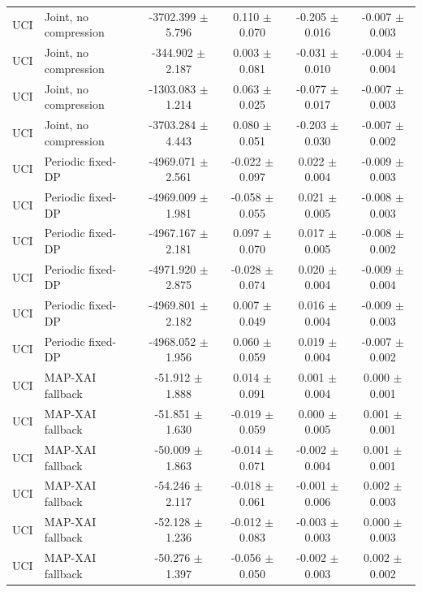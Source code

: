 \begin{table}[t]
\begin{tabular}{llcccc}
UCI & Joint, no compression & -3702.399 $\pm$ 5.796 & 0.110 $\pm$ 0.070 & -0.205 $\pm$ 0.016 & -0.007 $\pm$ 0.003 \\
UCI & Joint, no compression & -344.902 $\pm$ 2.187 & 0.003 $\pm$ 0.081 & -0.031 $\pm$ 0.010 & -0.004 $\pm$ 0.004 \\
UCI & Joint, no compression & -1303.083 $\pm$ 1.214 & 0.063 $\pm$ 0.025 & -0.077 $\pm$ 0.017 & -0.007 $\pm$ 0.003 \\
UCI & Joint, no compression & -3703.284 $\pm$ 4.443 & 0.080 $\pm$ 0.051 & -0.203 $\pm$ 0.030 & -0.007 $\pm$ 0.002 \\
UCI & Periodic fixed-DP & -4969.071 $\pm$ 2.561 & -0.022 $\pm$ 0.097 & 0.022 $\pm$ 0.004 & -0.009 $\pm$ 0.003 \\
UCI & Periodic fixed-DP & -4969.009 $\pm$ 1.981 & -0.058 $\pm$ 0.055 & 0.021 $\pm$ 0.005 & -0.008 $\pm$ 0.003 \\
UCI & Periodic fixed-DP & -4967.167 $\pm$ 2.181 & 0.097 $\pm$ 0.070 & 0.017 $\pm$ 0.005 & -0.008 $\pm$ 0.002 \\
UCI & Periodic fixed-DP & -4971.920 $\pm$ 2.875 & -0.028 $\pm$ 0.074 & 0.020 $\pm$ 0.004 & -0.009 $\pm$ 0.004 \\
UCI & Periodic fixed-DP & -4969.801 $\pm$ 2.182 & 0.007 $\pm$ 0.049 & 0.016 $\pm$ 0.004 & -0.009 $\pm$ 0.003 \\
UCI & Periodic fixed-DP & -4968.052 $\pm$ 1.956 & 0.060 $\pm$ 0.059 & 0.019 $\pm$ 0.004 & -0.007 $\pm$ 0.002 \\
UCI & MAP-XAI fallback & -51.912 $\pm$ 1.888 & 0.014 $\pm$ 0.091 & 0.001 $\pm$ 0.004 & 0.000 $\pm$ 0.001 \\
UCI & MAP-XAI fallback & -51.851 $\pm$ 1.630 & -0.019 $\pm$ 0.059 & 0.000 $\pm$ 0.005 & 0.001 $\pm$ 0.001 \\
UCI & MAP-XAI fallback & -50.009 $\pm$ 1.863 & -0.014 $\pm$ 0.071 & -0.002 $\pm$ 0.004 & 0.001 $\pm$ 0.001 \\
UCI & MAP-XAI fallback & -54.246 $\pm$ 2.117 & -0.018 $\pm$ 0.061 & -0.001 $\pm$ 0.006 & 0.002 $\pm$ 0.003 \\
UCI & MAP-XAI fallback & -52.128 $\pm$ 1.236 & -0.012 $\pm$ 0.083 & -0.003 $\pm$ 0.003 & 0.000 $\pm$ 0.003 \\
UCI & MAP-XAI fallback & -50.276 $\pm$ 1.397 & -0.056 $\pm$ 0.050 & -0.002 $\pm$ 0.003 & 0.002 $\pm$ 0.002 \\
\bottomrule
\end{tabular}
\end{table}
